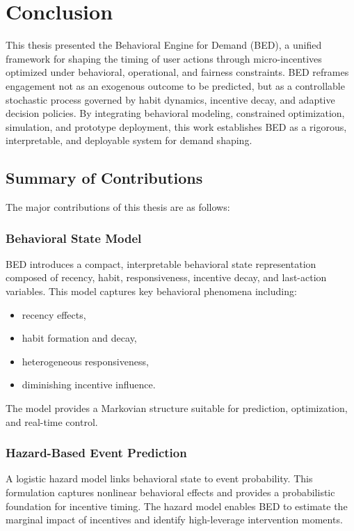 \chapter{Conclusion}

This thesis presented the Behavioral Engine for Demand (BED), a unified
framework for shaping the timing of user actions through micro-incentives
optimized under behavioral, operational, and fairness constraints. BED reframes
engagement not as an exogenous outcome to be predicted, but as a controllable
stochastic process governed by habit dynamics, incentive decay, and adaptive
decision policies. By integrating behavioral modeling, constrained optimization,
simulation, and prototype deployment, this work establishes BED as a rigorous,
interpretable, and deployable system for demand shaping.

\section{Summary of Contributions}

The major contributions of this thesis are as follows:

\subsection{Behavioral State Model}
BED introduces a compact, interpretable behavioral state representation composed
of recency, habit, responsiveness, incentive decay, and last-action variables.
This model captures key behavioral phenomena including:

\begin{itemize}
    \item recency effects,
    \item habit formation and decay,
    \item heterogeneous responsiveness,
    \item diminishing incentive influence.
\end{itemize}

The model provides a Markovian structure suitable for prediction, optimization,
and real-time control.

\subsection{Hazard-Based Event Prediction}
A logistic hazard model links behavioral state to event probability. This
formulation captures nonlinear behavioral effects and provides a probabilistic
foundation for incentive timing. The hazard model enables BED to estimate the
marginal impact of incentives and identify high-leverage intervention moments.

